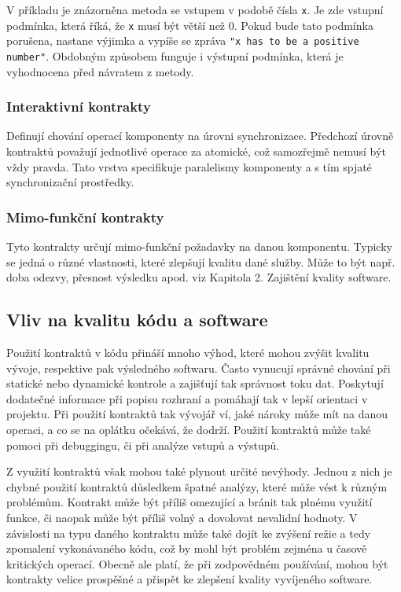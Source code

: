 			V příkladu je znázorněna metoda se vstupem v podobě čísla \texttt{x}. Je zde vstupní podmínka, která říká, že \texttt{x} musí být větší než 0. Pokud bude tato podmínka porušena, nastane výjimka a vypíše se zpráva \texttt{"x has to be a positive number"}. Obdobným způsobem funguje i výstupní podmínka, která je vyhodnocena před návratem z metody.
		
		\subsubsection{Interaktivní kontrakty}
			Definují chování operací komponenty na úrovni synchronizace. Předchozí úrovně kontraktů považují jednotlivé operace za atomické, což samozřejmě nemusí být vždy pravda. Tato vrstva specifikuje paralelismy komponenty a s tím spjaté synchronizační prostředky.
		
		\subsubsection{Mimo-funkční kontrakty}
			Tyto kontrakty určují mimo-funkční požadavky na danou komponentu. Typicky se jedná o různé vlastnosti, které zlepšují kvalitu dané služby. Může to být např. doba odezvy, přesnost výsledku apod. viz Kapitola 2. Zajištění kvality software.
		
	\subsection{Vliv na kvalitu kódu a software}
		Použití kontraktů v kódu přináší mnoho výhod, které mohou zvýšit kvalitu vývoje, respektive pak výsledného softwaru. Často vynucují správné chování při statické nebo dynamické kontrole a zajišťují tak správnost toku dat. Poskytují dodatečné informace při popisu rozhraní a pomáhají tak v lepší orientaci v projektu. Při použití kontraktů tak vývojář ví, jaké nároky může mít na danou operaci, a co se na oplátku očekává, že dodrží. Použití kontraktů může také pomoci při debuggingu, či při analýze vstupů a výstupů. 
		
		Z využití kontraktů však mohou také plynout určité nevýhody. Jednou z nich je chybné použití kontraktů důsledkem špatné analýzy, které může vést k různým problémům. Kontrakt  může být příliš omezující a bránit tak plnému využití funkce, či naopak může být příliš volný a dovolovat nevalidní hodnoty. V závislosti na typu daného kontraktu může také dojít ke zvýšení režie a tedy zpomalení vykonávaného kódu, což by mohl být problém zejména u časově kritických operací. Obecně ale platí, že při zodpovědném používání, mohou být kontrakty velice prospěšné a přispět ke zlepšení kvality vyvíjeného software.


